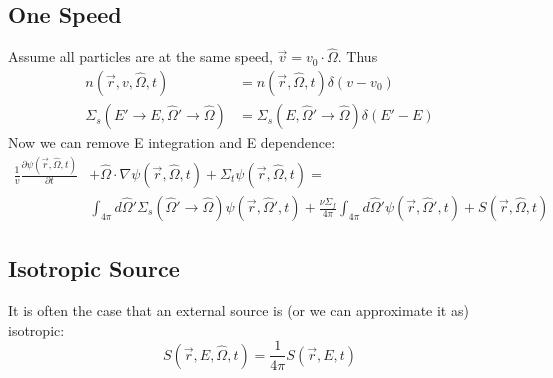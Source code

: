\documentclass[12pt]{article}
\newcommand{\vOmega}{\ensuremath{\hat{\Omega}}}
\begin{document}
\subsection*{One Speed}
Assume all particles are at the same speed, $\vec{v} = v_0 \cdot \vOmega$. Thus
\begin{align*}
n(\vec{r}, v, \vOmega, t) &= n(\vec{r}, \vOmega, t) \delta(v - v_0) \\
\Sigma_s(E' \rightarrow E, \vOmega' \rightarrow \vOmega) &= \Sigma_s(E, \vOmega' \rightarrow \vOmega)\delta(E' - E)
\end{align*}
%
Now we can remove E integration and E dependence:
%
\begin{align*}
\frac{1}{v}\frac{\partial \psi(\vec{r}, \vOmega, t)}{\partial t} &+ 
\vOmega \cdot \nabla \psi(\vec{r}, \vOmega, t) +
\Sigma_t \psi(\vec{r}, \vOmega, t) = \nonumber\\
%
& \int_{4\pi} d\vOmega' \Sigma_s(\vOmega' \rightarrow \vOmega) \psi(\vec{r}, \vOmega', t)  
+ \frac{\nu \Sigma_f}{4\pi} \int_{4\pi} d\vOmega' \psi(\vec{r},  \vOmega', t) 
+ S(\vec{r}, \vOmega, t) 
\end{align*}
%

\subsection*{Isotropic Source}
It is often the case that an external source is (or we can approximate it as) isotropic:
\[ S(\vec{r}, E, \vOmega, t) = \frac{1}{4 \pi}  S(\vec{r}, E, t) \]


\end{document}
